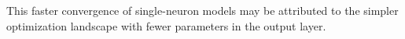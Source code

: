\documentclass[11pt]{article}
\begin{document}
This faster convergence of single-neuron models may be attributed to the simpler optimization landscape with fewer parameters in the output layer.












\end{document}
